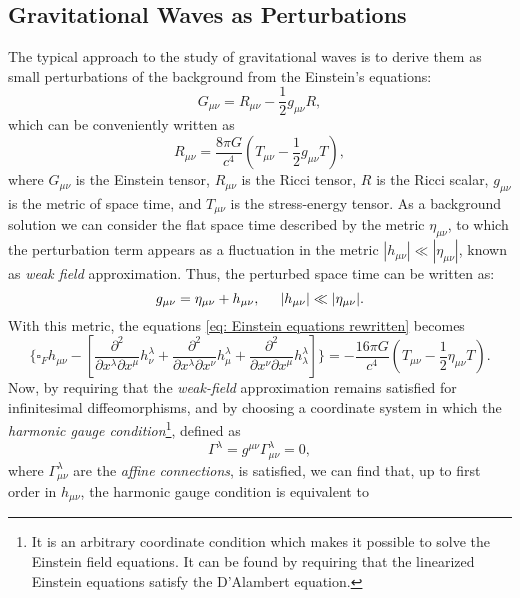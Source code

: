\subsection{Gravitational Waves as Perturbations}
The typical approach to the study of gravitational waves is to derive them as small perturbations of the background from the Einstein's equations: 
\begin{equation}
    G_{\mu\nu} = R_{\mu\nu} - \frac{1}{2}g_{\mu\nu}R,
\end{equation}
which can be conveniently written as 
\begin{equation}
    R_{\mu\nu}=\frac{8\pi G}{c^4}\left(T_{\mu\nu} - \frac{1}{2}g_{\mu\nu}T\right),
    \label{eq: Einstein equations rewritten}
\end{equation}
where $G_{\mu\nu}$ is the Einstein tensor, $R_{\mu\nu}$ is the Ricci tensor, $R$ is the Ricci scalar, $g_{\mu\nu}$ is the metric of space time, and $T_{\mu\nu}$ is the stress-energy tensor.
As a background solution we can consider the flat space time described by the metric $\eta_{\mu\nu}$, to which the perturbation term appears as a fluctuation in the metric $|h_{\mu\nu}|\ll|\eta_{\mu\nu}|$, known as \textit{weak field} approximation. Thus, the perturbed space time can be written as:
\[
    g_{\mu\nu} = \eta_{\mu\nu} + h_{\mu\nu}, \hspace{5mm}  |h_{\mu\nu}|\ll|\eta_{\mu\nu}|.
\] 
With this metric, the equations \ref{eq: Einstein equations rewritten} becomes
\[
    \{\square_F h_{\mu\nu} - \left[\frac{\partial^2}{\partial x^\lambda\partial x^\mu}h^\lambda_\nu + \frac{\partial^2}{\partial x^\lambda\partial x^\nu}h^\lambda_\mu + \frac{\partial^2}{\partial x^\nu\partial x^\mu}h^\lambda_\lambda\right]\} = -\frac{16\pi G}{c^4}\left(T_{\mu\nu} - \frac{1}{2}\eta_{\mu\nu}T\right).
\]
Now, by requiring that the \textit{weak-field} approximation remains satisfied for infinitesimal diffeomorphisms, and by choosing a coordinate system in which the \textit{harmonic gauge condition}\footnote{It is an arbitrary coordinate condition which makes it possible to solve the Einstein field equations. It can be found by requiring that the linearized Einstein equations satisfy the D'Alambert equation.}, defined as 
\begin{equation}
    \Gamma^\lambda = g^{\mu\nu}\Gamma^\lambda_{\mu\nu} = 0,
    \label{eq: Harmonic gauge definition}
\end{equation}
where $\Gamma^\lambda_{\mu\nu}$ are the \textit{affine connections}, is satisfied, we can find that, up to first order in $h_{\mu\nu}$, the harmonic gauge condition is equivalent to 
